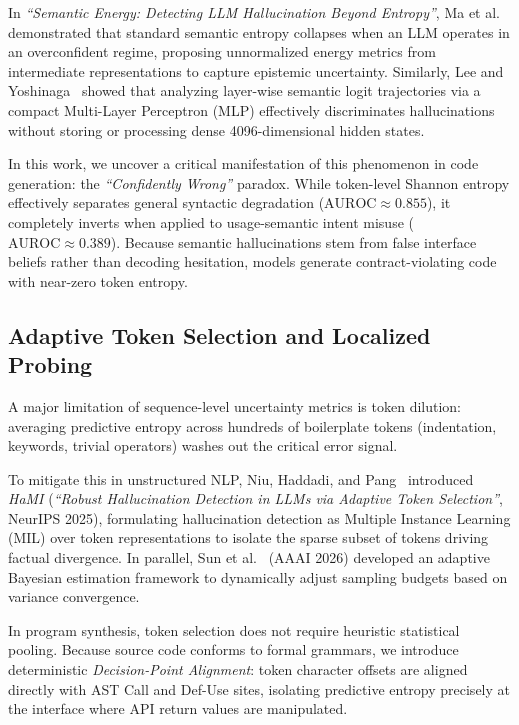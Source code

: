 In \emph{``Semantic Energy: Detecting LLM Hallucination Beyond Entropy''}, Ma et al.~\cite{ma2025semantic} demonstrated that standard semantic entropy collapses when an LLM operates in an overconfident regime, proposing unnormalized energy metrics from intermediate representations to capture epistemic uncertainty. Similarly, Lee and Yoshinaga~\cite{lee2026logit} showed that analyzing layer-wise semantic logit trajectories via a compact Multi-Layer Perceptron (MLP) effectively discriminates hallucinations without storing or processing dense 4096-dimensional hidden states.

In this work, we uncover a critical manifestation of this phenomenon in code generation: the \emph{``Confidently Wrong''} paradox. While token-level Shannon entropy effectively separates general syntactic degradation ($\text{AUROC} \approx 0.855$), it completely inverts when applied to usage-semantic intent misuse ($\text{AUROC} \approx 0.389$). Because semantic hallucinations stem from false interface beliefs rather than decoding hesitation, models generate contract-violating code with near-zero token entropy.

\subsection{Adaptive Token Selection and Localized Probing}
A major limitation of sequence-level uncertainty metrics is token dilution: averaging predictive entropy across hundreds of boilerplate tokens (indentation, keywords, trivial operators) washes out the critical error signal. 

To mitigate this in unstructured NLP, Niu, Haddadi, and Pang~\cite{niu2025robust} introduced \emph{HaMI} (\emph{``Robust Hallucination Detection in LLMs via Adaptive Token Selection''}, NeurIPS 2025), formulating hallucination detection as Multiple Instance Learning (MIL) over token representations to isolate the sparse subset of tokens driving factual divergence. In parallel, Sun et al.~\cite{sun2026adaptive} (AAAI 2026) developed an adaptive Bayesian estimation framework to dynamically adjust sampling budgets based on variance convergence.

In program synthesis, token selection does not require heuristic statistical pooling. Because source code conforms to formal grammars, we introduce deterministic \emph{Decision-Point Alignment}: token character offsets are aligned directly with AST Call and Def-Use sites, isolating predictive entropy precisely at the interface where API return values are manipulated.

